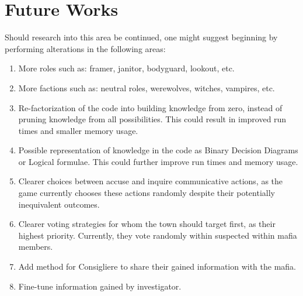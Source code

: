 \section{Future Works}\label{sec:future-works}
Should research into this area be continued, one might suggest beginning by
performing alterations in the following areas:
\begin{enumerate}
	\itemsep0px
	\item More roles such as: framer, janitor, bodyguard, lookout, etc.
	\item More factions such as: neutral roles, werewolves, witches, vampires, etc.
	\item Re-factorization of the code into building knowledge from zero, instead of
	      pruning knowledge from all possibilities. This could result in improved run
	      times and smaller memory usage.
	\item Possible representation of knowledge in the code as Binary Decision Diagrams or
	      Logical formulae. This could further improve run times and memory usage.
	\item Clearer choices between accuse and inquire communicative actions, as the game
	      currently chooses these actions randomly despite their potentially inequivalent
	      outcomes.
	\item Clearer voting strategies for whom the town should target first, as their
	      highest priority. Currently, they vote randomly within suspected within mafia
	      members.
	\item Add method for Consigliere to share their gained information with the mafia.
	\item Fine-tune information gained by investigator.
\end{enumerate}